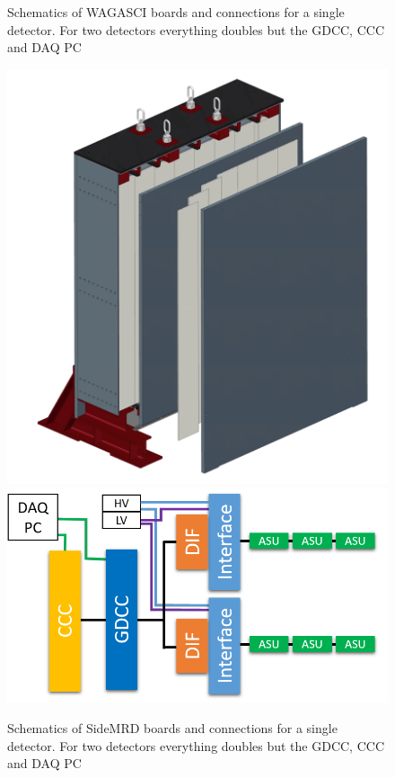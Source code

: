 \begin{figure}[ht]
\begin{minipage}{0.48\linewidth}
    \caption{\small Schematics of WAGASCI boards and connections for a single
      detector. For two detectors everything doubles but the GDCC, CCC and DAQ
      PC}\label{fig:DAQ-overview-WAGASCI}
  \end{minipage}%
  \begin{minipage}{0.48\linewidth}
    \centering
    \includegraphics[width=0.8\linewidth]{SideMRD-open-view} \\
    \includegraphics[width=0.98\linewidth]{DAQ-overview-SideMRD}
    \caption{\small Schematics of SideMRD boards and connections for a single
      detector. For two detectors everything doubles but the GDCC, CCC and DAQ
      PC}\label{fig:DAQ-overview-SideMRD}
  \end{minipage}
\end{figure}

